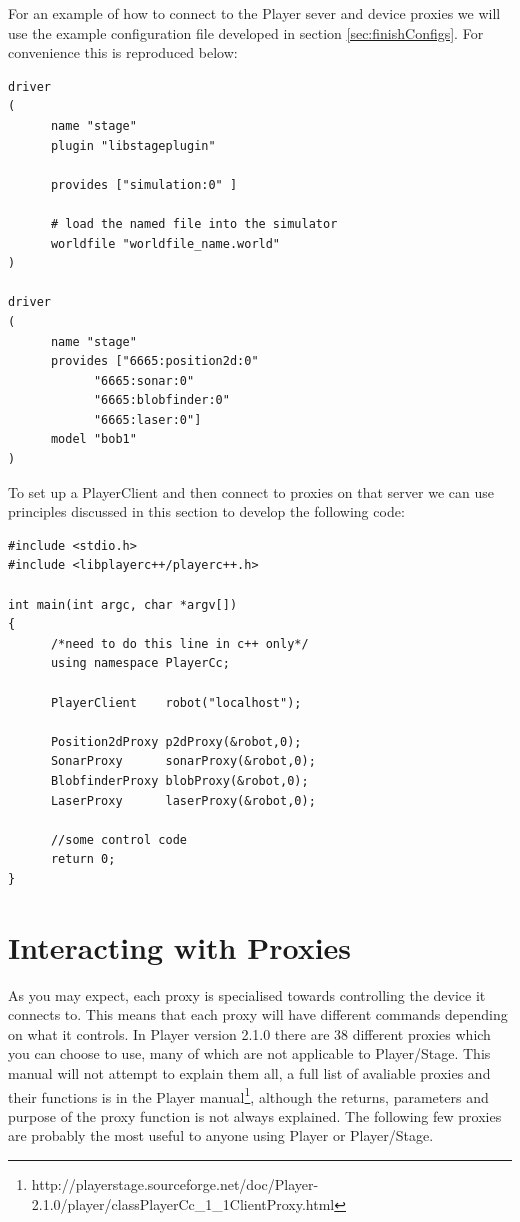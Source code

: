 \documentclass[a4paper]{report}
\newcommand{\plst}{Player/Stage\xspace}
\newcommand{\pl}{Player\xspace}
\begin{document}
For an example of how to connect to the \pl sever and device proxies we will use the example configuration file developed in section \ref{sec:finishConfigs}. For convenience this is reproduced below:
\begin{verbatim}
driver
(		
      name "stage"
      plugin "libstageplugin"

      provides ["simulation:0" ]

      # load the named file into the simulator
      worldfile "worldfile_name.world"	
)      

driver
(
      name "stage"
      provides ["6665:position2d:0" 
            "6665:sonar:0" 
            "6665:blobfinder:0" 
            "6665:laser:0"]
      model "bob1" 
)
\end{verbatim}
To set up a PlayerClient and then connect to proxies on that server we can use principles discussed in this section to develop the following code:
\begin{verbatim}
#include <stdio.h>
#include <libplayerc++/playerc++.h>

int main(int argc, char *argv[])
{
      /*need to do this line in c++ only*/
      using namespace PlayerCc;
	
      PlayerClient    robot("localhost");

      Position2dProxy p2dProxy(&robot,0);
      SonarProxy      sonarProxy(&robot,0);
      BlobfinderProxy blobProxy(&robot,0);
      LaserProxy      laserProxy(&robot,0);

      //some control code
      return 0;
}
\end{verbatim}

\section{Interacting with Proxies}\label{sec:interactingwithproxies}

As you may expect, each proxy is specialised towards controlling the device it connects to. This means that each proxy will have different commands depending on what it controls. 
In Player version 2.1.0 there are 38 different proxies which you can choose to use, many of which are not applicable to \plst. This manual will not attempt to explain them all, a full list of avaliable proxies and their functions is in the \pl manual\footnote{http://playerstage.sourceforge.net/doc/Player-2.1.0/player/classPlayerCc\_1\_1ClientProxy.html}, although the returns, parameters and purpose of the proxy function is not always explained. 
\newline The following few proxies are probably the most useful to anyone using \pl or \plst.
\end{document}
